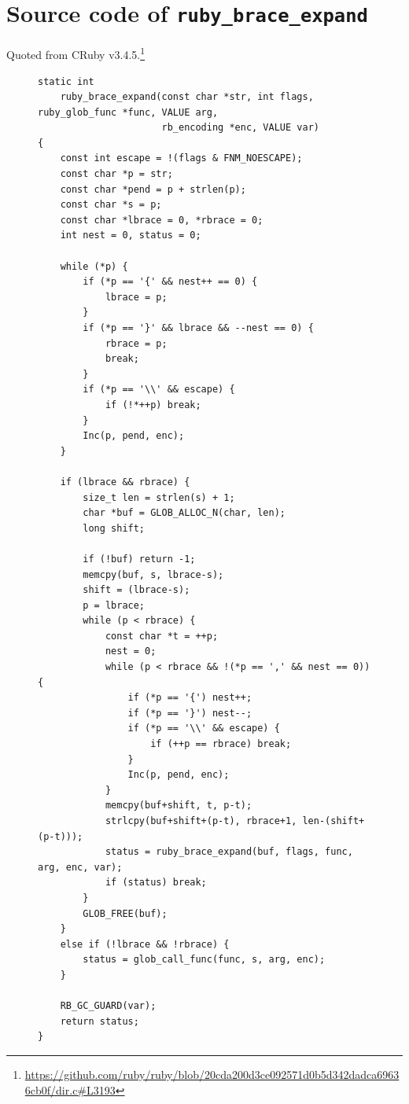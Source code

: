 \section{Source code of \texttt{ruby\_brace\_expand}}\label{app:ruby_brace_expand}
Quoted from CRuby v3.4.5.\footnote{\url{https://github.com/ruby/ruby/blob/20cda200d3ce092571d0b5d342dadca69636cb0f/dir.c#L3193}}

\begin{figure}[tb]
\begin{lstlisting}[caption={Source code of \texttt{ruby\_brace\_expand}},label={lst:ruby_brace_expand_full}]
	static int
	ruby_brace_expand(const char *str, int flags, ruby_glob_func *func, VALUE arg,
	                  rb_encoding *enc, VALUE var)
{
    const int escape = !(flags & FNM_NOESCAPE);
    const char *p = str;
    const char *pend = p + strlen(p);
    const char *s = p;
    const char *lbrace = 0, *rbrace = 0;
    int nest = 0, status = 0;

    while (*p) {
        if (*p == '{' && nest++ == 0) {
            lbrace = p;
        }
        if (*p == '}' && lbrace && --nest == 0) {
            rbrace = p;
            break;
        }
        if (*p == '\\' && escape) {
            if (!*++p) break;
        }
        Inc(p, pend, enc);
    }

    if (lbrace && rbrace) {
        size_t len = strlen(s) + 1;
        char *buf = GLOB_ALLOC_N(char, len);
        long shift;

        if (!buf) return -1;
        memcpy(buf, s, lbrace-s);
        shift = (lbrace-s);
        p = lbrace;
        while (p < rbrace) {
            const char *t = ++p;
            nest = 0;
            while (p < rbrace && !(*p == ',' && nest == 0)) {
                if (*p == '{') nest++;
                if (*p == '}') nest--;
                if (*p == '\\' && escape) {
                    if (++p == rbrace) break;
                }
                Inc(p, pend, enc);
            }
            memcpy(buf+shift, t, p-t);
            strlcpy(buf+shift+(p-t), rbrace+1, len-(shift+(p-t)));
            status = ruby_brace_expand(buf, flags, func, arg, enc, var);
            if (status) break;
        }
        GLOB_FREE(buf);
    }
    else if (!lbrace && !rbrace) {
        status = glob_call_func(func, s, arg, enc);
    }

    RB_GC_GUARD(var);
    return status;
}
\end{lstlisting}
\end{figure}
